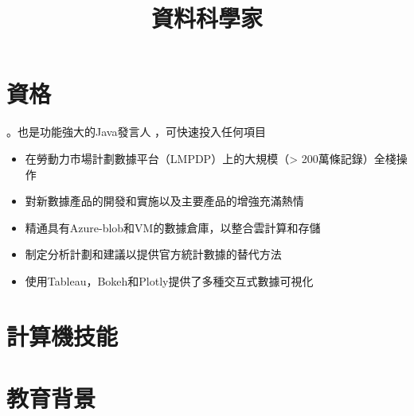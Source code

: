 \documentclass[11pt,a4paper,roman]{moderncv} %
\title{資料科學家} %
\begin{document}
\begin{CJK*}{UTF8}{bkai} %
\maketitle

\section{資格}
 {}
\begin{itemize}
    。也是功能強大的Java發言人
    ，可快速投入任何項目
\end{itemize}

 {
\begin{itemize}
    \item 在勞動力市場計劃數據平台（LMPDP）上的大規模（> 200萬條記錄）全棧操作
    \item 對新數據產品的開發和實施以及主要產品的增強充滿熱情
    \item 精通具有Azure-blob和VM的數據倉庫，以整合雲計算和存儲
\end {itemize}
}
 {}
\begin{itemize}
    \item 制定分析計劃和建議以提供官方統計數據的替代方法
    \item 使用Tableau，Bokeh和Plotly提供了多種交互式數據可視化
\end{itemize}


\section{計算機技能}

\section{教育背景}


\end{CJK*}
\end{document}
